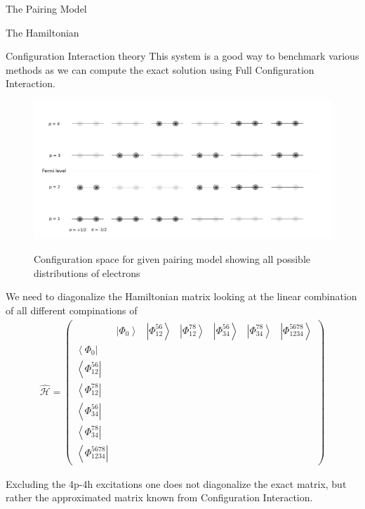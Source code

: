 \documentclass[twoside,english]{uiofysmaster}
\begin{document}
\begin{chapter}{The Pairing Model}
\begin{section}{The Hamiltonian}
	\end{section}


	\begin{section}{Configuration Interaction theory}
		This system is a good way to benchmark various methods as we can compute the exact solution using Full Configuration Interaction. 

		\begin{figure}[h]
			\includegraphics[width=1.1\linewidth]{Figures/Pairing_model2.pdf}
			\label{PairingModel_2}
			\caption{Configuration space for given pairing model showing all possible distributions of electrons}
		\end{figure}

 	We need to diagonalize the Hamiltonian matrix looking at the linear combination of all different compinations of 
	\begin{align}
		\hat{ \mathcal{H} } = \left(  \begin{matrix}
			& \left| \Phi_0 \right> & \left| \Phi_{12}^{56} \right> & \left| \Phi_{12}^{78} \right> & \left| \Phi_{34}^{56} \right> & \left| \Phi_{34}^{78} \right> & \left| \Phi_{1234}^{5678} \right> \\ 
			\left< \Phi_0 \right| &   &   &   &   &   & \\
			\left< \Phi_{12}^{56} \right| &   &   &   &   &   & \\
			\left< \Phi_{12}^{78} \right| &   &   &   &   &   & \\
			\left< \Phi_{34}^{56} \right| &   &   &   &   &   & \\
			\left< \Phi_{34}^{78} \right| &   &   &   &   &   & \\
			\left< \Phi_{1234}^{5678} \right| &   &   &   &   &   & 
		\end{matrix} \right)
	\end{align}

 Excluding the 4p-4h excitations one does not diagonalize the exact matrix, but rather the approximated matrix known from Configuration Interaction. 


\end{section}
\end{chapter}
\end{document}
